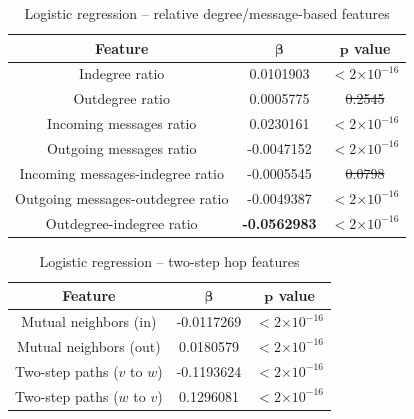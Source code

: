 \documentclass[conference]{IEEEtran}
\providecommand{\e}[1]{\ensuremath{\times 10^{#1}}}
\begin{document}
\begin{table}[!t]
\renewcommand{\arraystretch}{1.3}
\caption{Logistic regression -- relative degree/message-based features}
\label{table_recresults_logr}
\centering
\begin{tabular}{|c||c|c|}
\hline
\bf{Feature} & $\mathbf{\beta}$ & $\mathbf{p}$ value \\
\hline
Indegree ratio & 0.0101903 & $< 2 \e{-16} $ \\
Outdegree ratio & 0.0005775 & \sout{0.2545} \\
Incoming messages ratio & 0.0230161 & $< 2 \e{-16} $ \\
Outgoing messages ratio & -0.0047152 & $< 2 \e{-16} $ \\
Incoming messages-indegree ratio & -0.0005545 & \sout{0.0798} \\
Outgoing messages-outdegree ratio & -0.0049387 & $< 2 \e{-16} $ \\
Outdegree-indegree ratio & \bf{-0.0562983} & $< 2 \e{-16} $ \\
\hline
\end{tabular}
\end{table}

\begin{table}[!t]
\renewcommand{\arraystretch}{1.3}
\caption{Logistic regression -- two-step hop features}
\label{table_recresults_logrpath}
\centering
\begin{tabular}{|c||c|c|}
\hline
\bf{Feature} & $\mathbf{\beta}$ & $\mathbf{p}$ value \\
\hline
Mutual neighbors (in) & -0.0117269 & $< 2 \e{-16} $ \\
Mutual neighbors (out) & 0.0180579 & $< 2 \e{-16} $ \\
Two-step paths ($v$ to $w$) & -0.1193624 & $< 2 \e{-16} $ \\
Two-step paths ($w$ to $v$) & 0.1296081 & $< 2 \e{-16} $ \\
\hline
\end{tabular}
\end{table}
\end{document}
